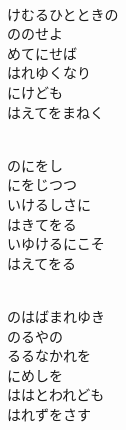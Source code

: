 \documentclass[10pt,b5j]{tarticle} %
\begin{document}
\begin{enumerate} %
    \setlength{\itemindent}{\itemmargin}
    \begin{minipage}[c]{\blocksize}
        
        \vspace{\linespace}
        \item~\\
        けむるひとときの\\
        ののせよ\\
        めてにせば\\
        はれゆくなり\\
        にけども\\
        はえてをまねく
        
    \end{minipage}
    \begin{minipage}[c]{\blocksize}
        
        \vspace{\linespace}
        \item~\\
        のにをし\\
        にをじつつ\\
        いけるしさに\\
        はきてをる\\
        いゆけるにこそ\\
        はえてをる
        
    \end{minipage}
    \begin{minipage}[c]{\blocksize}

        \vspace{\linespace}
        \item~\\
        のはばまれゆき\\ %
        のるやの\\
        るるなかれを\\
        にめしを\\
        ははとわれども\\
        はれずをさす
    
    \end{minipage}
\end{enumerate} %
\end{document}
